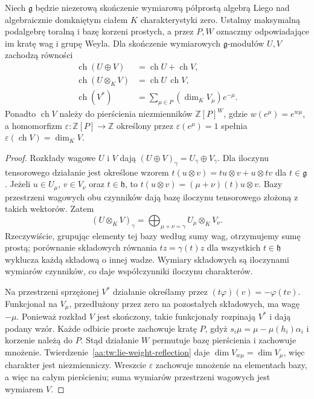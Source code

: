 \begin{twierdzenie}
\label{aa:tw:lie-character-operations}
Niech $\mathfrak g$ będzie niezerową skończenie wymiarową półprostą algebrą Liego nad algebraicznie domkniętym ciałem $K$ charakterystyki zero. Ustalmy maksymalną podalgebrę toralną i bazę korzeni prostych, a przez $P,W$ oznaczmy odpowiadające im kratę wag i grupę Weyla. Dla skończenie wymiarowych $\mathfrak g$-modułów $U,V$ zachodzą równości
\begin{align*}
 \operatorname{ch}(U\oplus V)&=\operatorname{ch}U+\operatorname{ch}V,\\
 \operatorname{ch}(U\otimes_K V)&=\operatorname{ch}U\,\operatorname{ch}V,\\
 \operatorname{ch}(V^*)&=\sum_{\mu\in P}(\dim_K V_\mu)e^{-\mu}.
\end{align*}
Ponadto $\operatorname{ch}V$ należy do pierścienia niezmienników $\mathbb Z[P]^W$, gdzie $w(e^\mu)=e^{w\mu}$, a homomorfizm $\varepsilon\colon\mathbb Z[P]\to\mathbb Z$ określony przez $\varepsilon(e^\mu)=1$ spełnia $\varepsilon(\operatorname{ch}V)=\dim_K V$.
\end{twierdzenie}
\begin{proof}
Rozkłady wagowe $U$ i $V$ dają $(U\oplus V)_\gamma=U_\gamma\oplus V_\gamma$. Dla iloczynu tensorowego działanie jest określone wzorem $t(u\otimes v)=tu\otimes v+u\otimes tv$ dla $t\in\mathfrak g$. Jeżeli $u\in U_\mu$, $v\in V_\nu$ oraz $t\in\mathfrak h$, to $t(u\otimes v)=(\mu+\nu)(t)u\otimes v$. Bazy przestrzeni wagowych obu czynników dają bazę iloczynu tensorowego złożoną z takich wektorów. Zatem
\[
 (U\otimes_K V)_\gamma=
 \bigoplus_{\mu+\nu=\gamma} U_\mu\otimes_K V_\nu.
\]
Rzeczywiście, grupując elementy tej bazy według sumy wag, otrzymujemy sumę prostą; porównanie składowych równania $tz=\gamma(t)z$ dla wszystkich $t\in\mathfrak h$ wyklucza każdą składową o innej wadze. Wymiary składowych są iloczynami wymiarów czynników, co daje współczynniki iloczynu charakterów.

Na przestrzeni sprzężonej $V^*$ działanie określamy przez $(t\varphi)(v)=-\varphi(tv)$. Funkcjonał na $V_\mu$, przedłużony przez zero na pozostałych składowych, ma wagę $-\mu$. Ponieważ rozkład $V$ jest skończony, takie funkcjonały rozpinają $V^*$ i dają podany wzór. Każde odbicie proste zachowuje kratę $P$, gdyż $s_i\mu=\mu-\mu(h_i)\alpha_i$ i korzenie należą do $P$. Stąd działanie $W$ permutuje bazę pierścienia i zachowuje mnożenie. Twierdzenie~\ref{aa:tw:lie-weight-reflection} daje $\dim V_{w\mu}=\dim V_\mu$, więc charakter jest niezmienniczy. Wreszcie $\varepsilon$ zachowuje mnożenie na elementach bazy, a więc na całym pierścieniu; suma wymiarów przestrzeni wagowych jest wymiarem $V$.
\end{proof}

